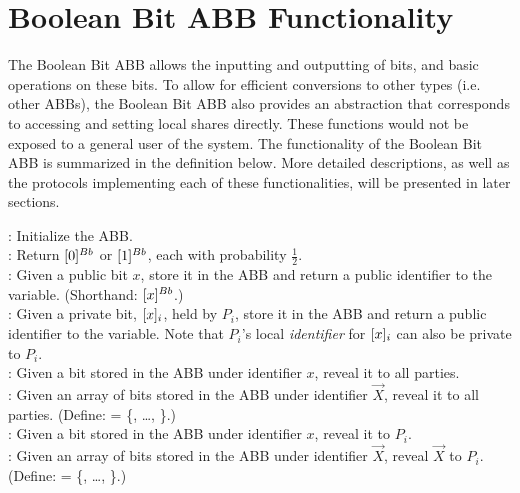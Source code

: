\section{Boolean Bit ABB Functionality}

The Boolean Bit ABB allows the inputting and outputting of bits,
and basic operations on these bits.
To allow for efficient conversions to other types (i.e. other ABBs),
the Boolean Bit ABB also provides an abstraction 
that corresponds to accessing and setting local shares directly.
These functions would not be exposed to a general user of the system.
The functionality of the Boolean Bit ABB is summarized in the definition below.
More detailed descriptions, as well as the protocols implementing
each of these functionalities, will be presented in later sections.


\begin{functionality}

    \Setup: Initialize the ABB. \\

    \RandBit: Return $[0]^{Bb}$ or $[1]^{Bb}$, each with probability $\frac{1}{2}$.\\

    : Given a public bit $x$, store it in the ABB
        and return a public identifier to the variable. 
        (Shorthand: $[x]^{Bb}$.)\\
    
    :  Given a private bit, $[x]_{i}$, held by $P_i$,
        store it in the ABB and return a public identifier to the variable.
        Note that $P_i$'s local \emph{identifier} for $[x]_{i}$ can 
        also be private to $P_i$. \\
    
    : Given a bit stored in the ABB under identifier $x$,
        reveal it to all parties. \\
    
    : Given an array of bits stored in the ABB under identifier $\vec{X}$,
        reveal it to all parties. (Define:  = \{, \ldots, \}.) \\
        
    : Given a bit stored in the ABB under identifier $x$,
        reveal it to $P_i$.  \\

    : Given an array of bits stored in the ABB under identifier $\vec{X}$,
        reveal $\vec{X}$ to $P_i$. (Define:  = \{, \ldots, \}.) \\


\end{functionality}
